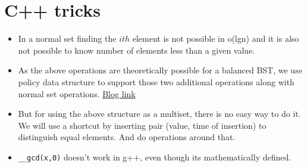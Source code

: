 \documentclass[../Notes.tex]{subfiles}
\begin{document}
\chapter{C++ tricks}

\begin{itemize}
	\item In a normal set finding the $ith$ element is not possible in o(lgn)
	and it is also not possible to know number of elements less than a given value.
	\item As the above operations are theoretically possible for a balanced BST, we use policy data structure to support those two additional operations along with normal set operations. \href{https://codeforces.com/blog/entry/11080}{Blog link}
	\item But for using the above structure as a multiset, there is no easy way to do it. We will use a shortcut by inserting pair (value, time of insertion) to distinguish equal elements. And do operations around that.
	\item \texttt{\_\_gcd(x,0)} doesn't work in g++, even though its mathematically defined.
\end{itemize}
\end{document}
